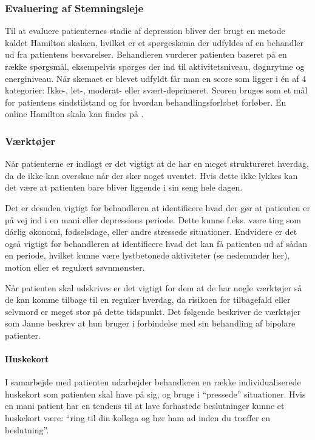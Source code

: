 \subsubsection{Evaluering af Stemningsleje}
Til at evaluere patienternes stadie af depression bliver der brugt en metode kaldet Hamilton skalaen, hvilket er et spørgeskema der udfyldes af en behandler ud fra patientens besvarelser. 
Behandleren vurderer patienten baseret på en række spørgsmål, eksempelvis spørges der ind til aktivitetsniveau, døgnrytme og energiniveau.
Når skemaet er blevet udfyldt får man en score som ligger i én af 4 kategorier: Ikke-, let-, moderat- eller svært-deprimeret. 
Scoren bruges som et mål for patientens sindstilstand og for hvordan behandlingsforløbet forløber.
En online Hamilton skala kan findes på \citet{hamilton}.

\subsubsection{Værktøjer}
Når patienterne er indlagt er det vigtigt at de har en meget struktureret hverdag, da de ikke kan overskue når der sker noget uventet.
Hvis dette ikke lykkes kan det være at patienten bare bliver liggende i sin seng hele dagen.

Det er desuden vigtigt for behandleren at identificere hvad der gør at patienten er på vej ind i en mani eller depressions periode.
Dette kunne f.eks. være ting som dårlig økonomi, fødselsdage, eller andre stressede situationer.
Endvidere er det også vigtigt for behandleren at identificere hvad det kan få patienten ud af sådan en periode, hvilket kunne være lystbetonede aktiviteter (se nedenunder her), motion eller et regulært søvnmønster.

Når patienten skal udskrives er det vigtigt for dem at de har nogle værktøjer så de kan komme tilbage til en regulær hverdag, da risikoen for tilbagefald eller selvmord er meget stor på dette tidspunkt. 
Det følgende beskriver de værktøjer som Janne beskrev at hun bruger i forbindelse med sin behandling af bipolare patienter.

\paragraph{Huskekort}
I samarbejde med patienten udarbejder behandleren en række individualiserede huskekort som patienten skal have på sig, og bruge i ``pressede'' situationer. 
Hvis en mani patient har en tendens til at lave forhastede beslutninger kunne et huskekort være: ``ring til din kollega og hør ham ad inden du træffer en beslutning''.

